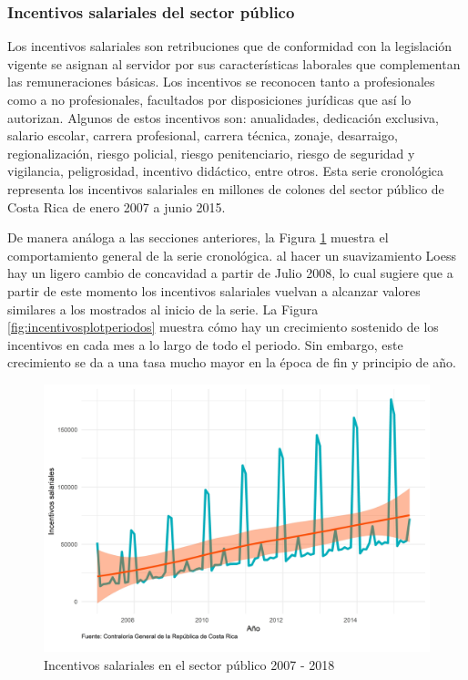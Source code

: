 \documentclass[
]{article}
\begin{document}
\subsubsection{Incentivos salariales del sector público}

Los incentivos salariales son retribuciones que de conformidad con la
legislación vigente se asignan al servidor por sus características
laborales que complementan las remuneraciones básicas. Los incentivos se
reconocen tanto a profesionales como a no profesionales, facultados por
disposiciones jurídicas que así lo autorizan. Algunos de estos
incentivos son: anualidades, dedicación exclusiva, salario escolar,
carrera profesional, carrera técnica, zonaje, desarraigo,
regionalización, riesgo policial, riesgo penitenciario, riesgo de
seguridad y vigilancia, peligrosidad, incentivo didáctico, entre otros.
Esta serie cronológica representa los incentivos salariales en millones
de colones del sector público de Costa Rica de enero 2007 a junio 2015.

De manera análoga a las secciones anteriores, la Figura
\ref{fig:incentivosplotgeneral} muestra el comportamiento general de la
serie cronológica. al hacer un suavizamiento Loess hay un ligero cambio
de concavidad a partir de Julio 2008, lo cual sugiere que a partir de
este momento los incentivos salariales vuelvan a alcanzar valores
similares a los mostrados al inicio de la serie. La Figura
\ref{fig:incentivosplotperiodos} muestra cómo hay un crecimiento
sostenido de los incentivos en cada mes a lo largo de todo el periodo.
Sin embargo, este crecimiento se da a una tasa mucho mayor en la época
de fin y principio de año.

\begin{figure}[H]
\includegraphics[width=1\linewidth,height=1\textheight]{Tesis_files/figure-latex/incentivosplotgeneral-1} \caption{Incentivos salariales en el sector público 2007 - 2018}\label{fig:incentivosplotgeneral}
\end{figure}
\end{document}
